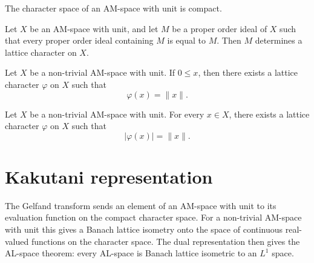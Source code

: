 \begin{theorem}
\label{thm:latticeCharacter-compactSpace}
\leanok
{}
The character space of an AM-space with unit is compact.
\end{theorem}

\begin{theorem}
\label{thm:latticeCharacter-ofMaximalIdeal}
\leanok
{}
Let $X$ be an AM-space with unit, and let $M$ be a proper order
ideal of $X$ such that every proper order ideal containing $M$ is
equal to $M$. Then $M$ determines a lattice character on $X$.
\end{theorem}

\begin{theorem}
\label{thm:latticeCharacter-exists-apply-eq-norm-of-nonneg}
\leanok
{}
Let $X$ be a non-trivial AM-space with unit. If $0 \le x$, then
there exists a lattice character $\varphi$ on $X$ such that
\[
  \varphi(x) = \lVert x\rVert.
\]
\end{theorem}

\begin{theorem}
\label{thm:latticeCharacter-exists-abs-apply-eq-norm}
\leanok
{}
Let $X$ be a non-trivial AM-space with unit. For every $x \in X$,
there exists a lattice character $\varphi$ on $X$ such that
\[
  \lvert \varphi(x)\rvert = \lVert x\rVert.
\]
\end{theorem}

\section{Kakutani representation}

The Gelfand transform sends an element of an AM-space with unit to
its evaluation function on the compact character space. For a
non-trivial AM-space with unit this gives a Banach lattice isometry
onto the space of continuous real-valued functions on the character
space. The dual representation then gives the AL-space theorem:
every AL-space is Banach lattice isometric to an $L^1$ space.

